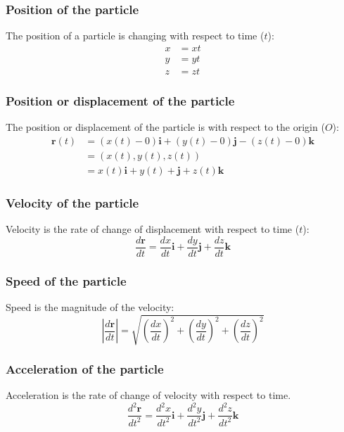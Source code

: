 \documentclass[11pt]{article}
\begin{document}
\subsubsection{Position of the particle}
\label{sec:org9eec37a}
The position of a particle is changing with respect to time (\(t\)):
\begin{align*}
x &= xt \\
y &= yt \\
z &= zt
\end{align*}
\subsubsection{Position or displacement of the particle}
\label{sec:org2d104bf}
The position or displacement of the particle is with respect to the origin (\(O\)):
\begin{align*}
\boldsymbol{r} (t) &= (x(t) - 0) \boldsymbol{i} + (y(t) - 0) \boldsymbol{j} - (z(t) - 0) \boldsymbol{k} \\
&= (x(t), y(t), z(t)) \\
&= x(t) \boldsymbol{i} + y(t) + \boldsymbol{j} + z(t) \boldsymbol{k}
\end{align*}
\subsubsection{Velocity of the particle}
\label{sec:org2fb9181}
Velocity is the rate of change of displacement with respect to time (\(t\)):
\[\frac{d \boldsymbol{r}}{dt} = \frac{dx}{dt} \boldsymbol{i} + \frac{dy}{dt} \boldsymbol{j} + \frac{dz}{dt} \boldsymbol{k}\]
\subsubsection{Speed of the particle}
\label{sec:orgb48de17}
Speed is the magnitude of the velocity:
\[\left| \frac{d \boldsymbol{r}}{dt} \right| = \sqrt{\left(\frac{dx}{dt} \right)^2 + \left(\frac{dy}{dt} \right)^2 + \left(\frac{dz}{dt} \right)^2}\]
\subsubsection{Acceleration of the particle}
\label{sec:orgccf02d8}
Acceleration is the rate of change of velocity with respect to time.
\[\frac{d^2 \boldsymbol{r}}{dt^2} = \frac{d^2 x}{dt^2} \boldsymbol{i} + \frac{d^2 y}{dt^2} \boldsymbol{j} + \frac{d^2 z}{dt^2} \boldsymbol{k}\]

 \newpage
\end{document}
